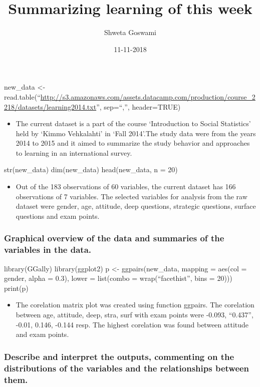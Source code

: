 \documentclass[]{article}
\title{Summarizing learning of this week}
\author{Shweta Goswami}
\date{11-11-2018}
\providecommand{\tightlist}{%
  \setlength{\itemsep}{0pt}\setlength{\parskip}{0pt}}
\begin{document}
\maketitle

new\_data \textless{}-
read.table(``\url{http://s3.amazonaws.com/assets.datacamp.com/production/course_2218/datasets/learning2014.txt}'',
sep=``,'', header=TRUE)

\begin{itemize}
\tightlist
\item
  The current dataset is a part of the course `Introduction to Social
  Statistics' held by `Kimmo Vehkalahti' in `Fall 2014'.The study data
  were from the years 2014 to 2015 and it aimed to summarize the study
  behavior and approaches to learning in an international survey.
\end{itemize}

str(new\_data) dim(new\_data) head(new\_data, n = 20)

\begin{itemize}
\tightlist
\item
  Out of the 183 observations of 60 variables, the current dataset has
  166 observations of 7 variables. The selected variables for analysis
  from the raw dataset were gender, age, attitude, deep questions,
  strategic questions, surface questions and exam points.
\end{itemize}

\subsubsection{Graphical overview of the data and summaries of the
variables in the
data.}\label{graphical-overview-of-the-data-and-summaries-of-the-variables-in-the-data.}

library(GGally) library(ggplot2) p \textless{}- ggpairs(new\_data,
mapping = aes(col = gender, alpha = 0.3), lower = list(combo =
wrap(``facethist'', bins = 20))) print(p)

\begin{itemize}
\tightlist
\item
  The corelation matrix plot was created using function ggpairs. The
  corelation between age, attitude, deep, stra, surf with exam points
  were -0.093, ``0.437'', -0.01, 0.146, -0.144 resp. The highest
  corelation was found between attitude and exam points.
\end{itemize}

\subsubsection{Describe and interpret the outputs, commenting on the
distributions of the variables and the relationships between
them.}\label{describe-and-interpret-the-outputs-commenting-on-the-distributions-of-the-variables-and-the-relationships-between-them.}
\end{document}
